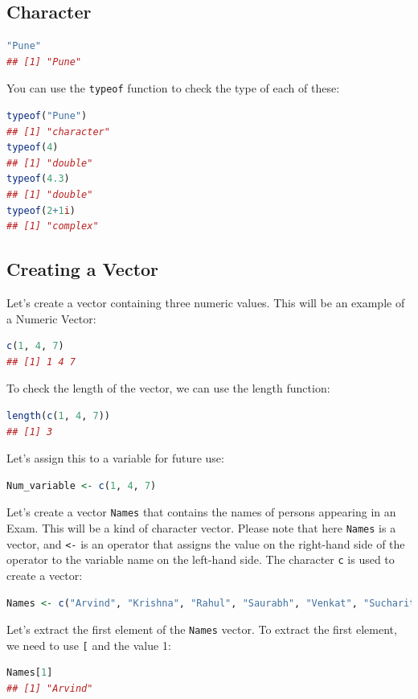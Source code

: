 \documentclass[10pt]{book}
\begin{document}
\subsection{Character}
\begin{lstlisting}[language=R]
"Pune"
## [1] "Pune"
\end{lstlisting}

You can use the \texttt{typeof} function to check the type of each of these:
\begin{lstlisting}[language=R]
typeof("Pune")
## [1] "character"
typeof(4)
## [1] "double"
typeof(4.3)
## [1] "double"
typeof(2+1i) 
## [1] "complex"
\end{lstlisting}

\subsection{Creating a Vector}
Let's create a vector containing three numeric values. This will be an example of a Numeric Vector:
\begin{lstlisting}[language=R]
c(1, 4, 7)
## [1] 1 4 7
\end{lstlisting}

To check the length of the vector, we can use the length function:
\begin{lstlisting}[language=R]
length(c(1, 4, 7))
## [1] 3
\end{lstlisting}

Let's assign this to a variable for future use:
\begin{lstlisting}[language=R]
Num_variable <- c(1, 4, 7)
\end{lstlisting}

Let’s create a vector \texttt{Names} that contains the names of persons appearing in an Exam. This will be a kind of character vector. Please note that here \texttt{Names} is a vector, and \texttt{<-} is an operator that assigns the value on the right-hand side of the operator to the variable name on the left-hand side. The character \texttt{c} is used to create a vector:
\begin{lstlisting}[language=R]
Names <- c("Arvind", "Krishna", "Rahul", "Saurabh", "Venkat", "Sucharitha")
\end{lstlisting}

Let's extract the first element of the \texttt{Names} vector. To extract the first element, we need to use \texttt{[} and the value 1:
\begin{lstlisting}[language=R]
Names[1]
## [1] "Arvind"
\end{lstlisting}
\end{document}
